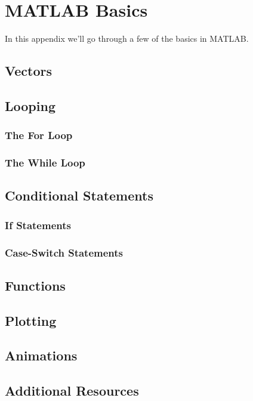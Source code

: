 \chapter{MATLAB Basics}
In this appendix we'll go through a few of the basics in MATLAB.

\section{Vectors}

\section{Looping}
\subsection{The For Loop}

\subsection{The While Loop}


\section{Conditional Statements}
\subsection{If Statements}

\subsection{Case-Switch Statements}

\section{Functions}


\section{Plotting}


\section{Animations}


\section{Additional Resources}


